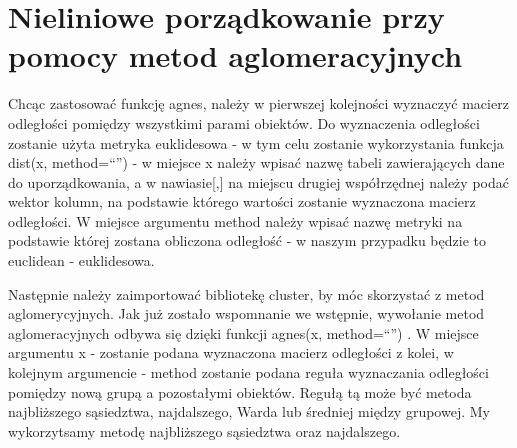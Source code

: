 \documentclass[12pt,a4paper]{report}
\begin{document}
{\begin{Shaded}
\begin{Highlighting}[]
\end{Highlighting}
\end{Shaded}

\section{Nieliniowe porządkowanie przy pomocy metod
aglomeracyjnych}\label{nieliniowe-porzadkowanie-przy-pomocy-metod-aglomeracyjnych}

Chcąc zastosować funkcję agnes, należy w pierwszej kolejności wyznaczyć
macierz odległości pomiędzy wszystkimi parami obiektów. Do wyznaczenia
odległości zostanie użyta metryka euklidesowa - w tym celu zostanie
wykorzystania funkcja dist(x, method=``'') - w miejsce x należy wpisać
nazwę tabeli zawierających dane do uporządkowania, a w nawiasie{[},{]}
na miejscu drugiej współrzędnej należy podać wektor kolumn, na podstawie
którego wartości zostanie wyznaczona macierz odległości. W miejsce
argumentu method należy wpisać nazwę metryki na podstawie której zostana
obliczona odległość - w naszym przypadku będzie to euclidean -
euklidesowa.

\begin{Shaded}
\begin{Highlighting}[]
\StringTok{ }\NormalTok{(dane_porzadkowanie[,}\NormalTok{(}\NormalTok{,}\NormalTok{,}
            \NormalTok{,}\NormalTok{,}\NormalTok{)],                                           } \NormalTok{)}
\end{Highlighting}
\end{Shaded}

Następnie należy zaimportować bibliotekę cluster, by móc skorzystać z
metod aglomerycyjnych. Jak już zostało wspomnanie we wstępnie, wywołanie
metod aglomeracyjnych odbywa się dzięki funkcji agnes(x, method=``'') .
W miejsce argumentu x - zostanie podana wyznaczona macierz odległości z
kolei, w kolejnym argumencie - method zostanie podana reguła wyznaczania
odległości pomiędzy nową grupą a pozostałymi obiektów. Regułą tą może
być metoda najbliższego sąsiedztwa, najdalszego, Warda lub średniej
między grupowej. My wykorzytsamy metodę najbliższego sąsiedztwa oraz
najdalszego.

\begin{Shaded}
\begin{Highlighting}[]
\StringTok{ } \NormalTok{)}
\StringTok{ } \NormalTok{)}
\end{Highlighting}
\end{Shaded}

}
\end{document}

